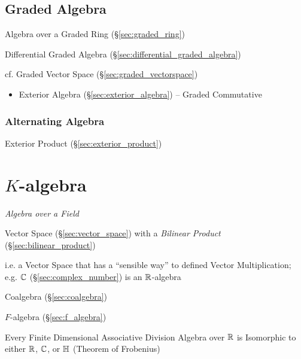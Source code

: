 {{%
\subsection{Graded Algebra}\label{sec:graded_algebra}

Algebra over a Graded Ring (\S\ref{sec:graded_ring})

Differential Graded Algebra (\S\ref{sec:differential_graded_algebra})

cf. Graded Vector Space (\S\ref{sec:graded_vectorspace})

\begin{itemize}
  \item Exterior Algebra (\S\ref{sec:exterior_algebra}) -- Graded Commutative
\end{itemize}



\subsubsection{Alternating Algebra}\label{sec:alternating_algebra}

Exterior Product (\S\ref{sec:exterior_product})



\section{$K$-algebra}\label{sec:k_algebra}

\emph{Algebra over a Field}

Vector Space (\S\ref{sec:vector_space}) with a \emph{Bilinear Product}
(\S\ref{sec:bilinear_product})

i.e. a Vector Space that has a ``sensible way'' to defined Vector
Multiplication; e.g. $\mathbb{C}$ (\S\ref{sec:complex_number}) is an
$\mathbb{R}$-algebra

Coalgebra (\S\ref{sec:coalgebra})

$F$-algebra (\S\ref{sec:f_algebra})

Every Finite Dimensional Associative Division Algebra over $\mathbb{R}$ is
Isomorphic to either $\mathbb{R}$, $\mathbb{C}$, or $\mathbb{H}$ (Theorem of
Frobenius) %



}}
